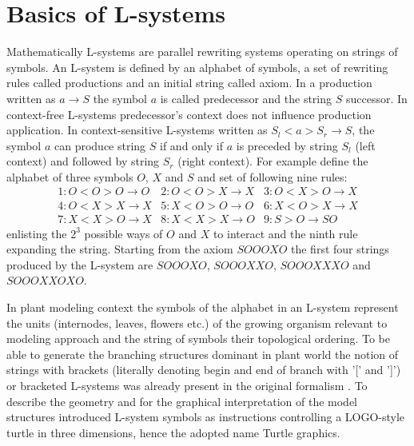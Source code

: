 \section{Basics of L-systems}

Mathematically L-systems  are parallel rewriting  systems operating on
strings of symbols. An L-system  is defined by an alphabet of symbols,
a  set of  rewriting rules  called productions  and an  initial string
called axiom. In a production  written as $a \rightarrow S$ the symbol
$a$  is   called  predecessor  and  the  string   $S$  successor.   In
context-free  L-systems  predecessor's   context  does  not  influence
production  application.  In  context-sensitive  L-systems written  as
$S_l < a  > S_r \rightarrow S$, the symbol $a$  can produce string $S$
if and  only if  $a$ is  preceded by string  $S_l$ (left  context) and
followed  by string  $S_r$ (right  context).  For  example  define the
alphabet of three  symbols $O$, $X$ and $S$ and  set of following nine
rules:
\begin{equation}\label{eq:ca110}
\begin{array}{lll}
1:O < O > O \rightarrow O & 2:O < O > X \rightarrow X &
3:O < X > O \rightarrow X \\ 
4:O < X > X \rightarrow X & 5:X < O > O \rightarrow O&
6:X < O > X \rightarrow X \\
7:X < X > O \rightarrow X & 8:X < X > X \rightarrow O & 
9:S > O \rightarrow SO
\end{array}
\end{equation}
enlisting the $2^3$  possible ways of $O$ and $X$  to interact and the
ninth rule expanding the string.  Starting from the axiom $SOOOXO$ the
first four  strings produced by the L-system  are $SOOOXO$, $SOOOXXO$,
\linebreak $SOOOXXXO$ and $SOOOXXOXO$.

In plant modeling  context the symbols of the  alphabet in an L-system
represent the units (internodes, leaves, flowers etc.)  of the growing
organism relevant to modeling approach and the string of symbols their
topological ordering.  To be able to generate the branching structures
dominant in plant world the notion of strings with brackets (literally
denoting  begin and  end  of branch  with  '[' and  ']') or  bracketed
L-systems   was   already    present   in   the   original   formalism
\citep{lindenmayer:68}. To describe the geometry and for the graphical
interpretation  of  the   model  structures  \citet{pp:86}  introduced
L-system  symbols  as  instructions  controlling a  LOGO-style  turtle
\citep{abelson:82} in three dimensions,  hence the adopted name Turtle
graphics.


